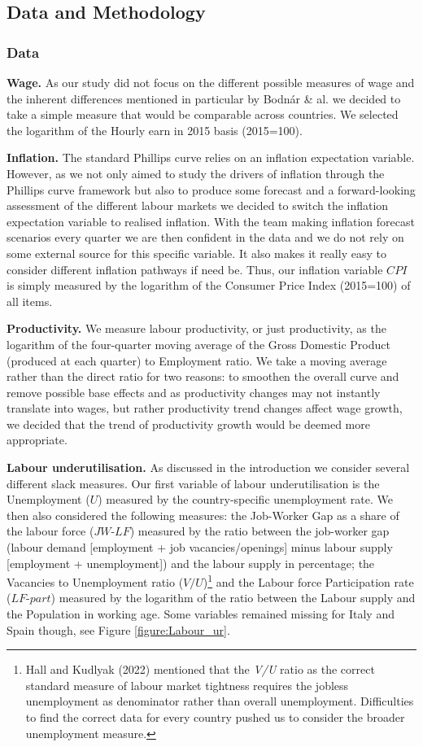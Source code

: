 \subsection{Data and Methodology}
\subsubsection{Data}

\quad \textbf{Wage.} As our study did not focus on the different possible measures of wage and the inherent differences mentioned in particular by Bodnár \& al.\cite{labour7} we decided to take a simple measure that would be comparable across countries. 
We selected the logarithm of the Hourly earn in 2015 basis (2015=100). 

\textbf{Inflation.} The standard Phillips curve relies on an inflation expectation variable. 
However, as we not only aimed to study the drivers of inflation through the Phillips curve framework but also to produce some forecast and a forward-looking assessment of the different labour markets we decided to switch the inflation expectation variable to realised inflation. 
With the team making inflation forecast scenarios every quarter we are then confident in the data and we do not rely on some external source for this specific variable. 
It also makes it really easy to consider different inflation pathways if need be. 
Thus, our inflation variable $CPI$ is simply measured by the logarithm of the Consumer Price Index (2015=100) of all items.

\textbf{Productivity.} We measure labour productivity, or just productivity, as the logarithm of the four-quarter moving average of the Gross Domestic Product (produced at each quarter) to Employment ratio. 
We take a moving average rather than the direct ratio for two reasons: to smoothen the overall curve and remove possible base effects and as productivity changes may not instantly translate into wages, but rather productivity trend changes affect wage growth, we decided that the trend of productivity growth would be deemed more appropriate.

\textbf{Labour underutilisation.} As discussed in the introduction we consider several different slack measures. 
Our first variable of labour underutilisation is the Unemployment ($U$) measured by the country-specific unemployment rate. 
We then also considered the following measures: the Job-Worker Gap as a share of the labour force ($JW\textrm{-}LF$) measured by the ratio between the job-worker gap (labour demand [employment + job vacancies/openings] minus labour supply [employment + unemployment]) and the labour supply in percentage; the Vacancies to Unemployment ratio ($V/U$)\footnote{Hall and Kudlyak (2022) mentioned that the \textit{V/U} ratio as the correct standard measure of labour market tightness requires the jobless unemployment as denominator rather than overall unemployment. Difficulties to find the correct data for every country pushed us to consider the broader unemployment measure.} and the Labour force Participation rate ($LF\textrm{-}part$) measured by the logarithm of the ratio between the Labour supply and the Population in working age.
Some variables remained missing for Italy and Spain though, see Figure \ref{figure:Labour_ur}.

